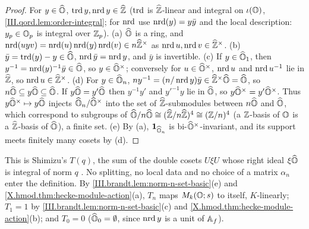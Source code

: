 \begin{lemma}
\end{lemma}
\begin{proof}
For $y\in\Ohat$, $\trd y,\nrd y\in\Zhat$ ($\trd$ is $\Zhat$-linear and integral on $\iota(\Oord)$, \cref{III.qord.lem:order-integral}; for $\nrd$
use $\nrd(y)=y\bar y$ and the local description: $y_p\in\Oord_p$ is integral over $\Zp$). (a) $\Ohat$ is a ring, and
$\nrd(uyv)=\nrd(u)\nrd(y)\nrd(v)\in n\Zhat^\times$ as $\nrd u,\nrd v\in\Zhat^\times$. (b) $\bar y=\trd(y)-y\in\Ohat$, $\nrd\bar y=\nrd y$, and $\bar y$ is
invertible. (c) If $y\in\Ohat_1$, then $y^{-1}=\nrd(y)^{-1}\bar y\in\Ohat$, so $y\in\Ohat^\times$; conversely for $u\in\Ohat^\times$, $\nrd u$ and
$\nrd u^{-1}$ lie in $\Zhat$, so $\nrd u\in\Zhat^\times$. (d) For $y\in\Ohat_n$, $ny^{-1}=(n/\nrd y)\bar y\in\Zhat^\times\Ohat=\Ohat$, so
$n\Ohat\subseteq y\Ohat\subseteq\Ohat$. If $y\Ohat=y'\Ohat$ then $y^{-1}y'$ and $y'^{-1}y$ lie in $\Ohat$, so $y\Ohat^\times=y'\Ohat^\times$. Thus
$y\Ohat^\times\mapsto y\Ohat$ injects $\Ohat_n/\Ohat^\times$ into the set of $\Zhat$-submodules between $n\Ohat$ and $\Ohat$, which correspond to subgroups
of $\Ohat/n\Ohat\cong(\Zhat/n\Zhat)^4\cong(\Z/n)^4$ (a $\Z$-basis of $\Oord$ is a $\Zhat$-basis of $\Ohat$), a finite set. (e) By (a),
$\mathbf 1_{\Ohat_n}$ is bi-$\Ohat^\times$-invariant, and its support meets finitely many cosets by (d).
\end{proof}

\begin{definition}
\end{definition}
\noindent This is Shimizu's $T(q)$, the sum of the double cosets $U\xi U$ whose right ideal $\xi\Ohat$ is integral of norm $q$
\cite[§1, p.~169]{Shz}. No splitting, no local data and no choice of a matrix $\alpha_n$ enter the definition. By
\cref{III.brandt.lem:norm-n-set-basic}(e) and \cref{X.hmod.thm:hecke-module-action}(a), $T_n$ maps $M_k(\Oord;s)$ to itself, $K$-linearly;
$T_1=1$ by \cref{III.brandt.lem:norm-n-set-basic}(c) and \cref{X.hmod.thm:hecke-module-action}(b); and $T_0=0$ ($\Ohat_0=\emptyset$, since
$\nrd y$ is a unit of $\Af$).

